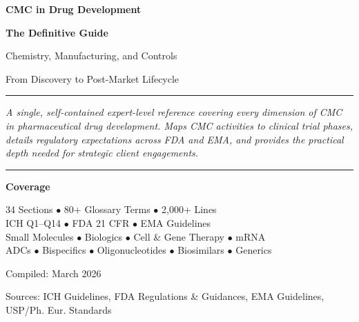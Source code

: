 \documentclass[
  11pt,
  a4paper,
]{report}
\author{}
\date{}
\begin{document}
\begin{titlepage}
\centering
\vspace*{2cm}

{\Huge\bfseries CMC in Drug Development\par}
\vspace{0.5cm}
{\LARGE\bfseries The Definitive Guide\par}
\vspace{1cm}
{\Large Chemistry, Manufacturing, and Controls\par}
{\Large From Discovery to Post-Market Lifecycle\par}

\vspace{2cm}

\rule{\textwidth}{0.4pt}
\vspace{0.5cm}

{\large\itshape A single, self-contained expert-level reference covering every dimension of CMC in pharmaceutical drug development. Maps CMC activities to clinical trial phases, details regulatory expectations across FDA and EMA, and provides the practical depth needed for strategic client engagements.\par}

\vspace{0.5cm}
\rule{\textwidth}{0.4pt}

\vspace{2cm}

{\large\bfseries Coverage\par}
\vspace{0.5cm}
{\normalsize
34 Sections $\bullet$ 80+ Glossary Terms $\bullet$ 2,000+ Lines\\[0.3cm]
ICH Q1--Q14 $\bullet$ FDA 21 CFR $\bullet$ EMA Guidelines\\[0.3cm]
Small Molecules $\bullet$ Biologics $\bullet$ Cell \& Gene Therapy $\bullet$ mRNA\\[0.3cm]
ADCs $\bullet$ Bispecifics $\bullet$ Oligonucleotides $\bullet$ Biosimilars $\bullet$ Generics
\par}

\vfill

{\large Compiled: March 2026\par}
\vspace{0.5cm}
{\small Sources: ICH Guidelines, FDA Regulations \& Guidances, EMA Guidelines, USP/Ph. Eur. Standards\par}

\end{titlepage}
\end{document}
